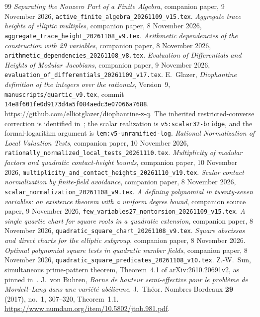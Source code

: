 \documentclass[11pt,a4paper]{article}
\begin{document}
\begin{thebibliography}{99}
\emph{Separating the Nonzero Part of a Finite Algebra},
companion paper, 9 November 2026,
\nolinkurl{active_finite_algebra_20261109_v15.tex}.
\emph{Aggregate trace heights of elliptic multiples},
companion paper, 8 November 2026,
\nolinkurl{aggregate_trace_height_20261108_v9.tex}.
\emph{Arithmetic dependencies of the construction with 29 variables},
companion paper, 8 November 2026,
\nolinkurl{arithmetic_dependencies_20261108_v8.tex}.
\emph{Evaluation of Differentials and Heights of Modular Jacobians},
companion paper, 9 November 2026,
\nolinkurl{evaluation_of_differentials_20261109_v17.tex}.
E.~Glazer, \emph{Diophantine definition of the integers over the
rationals}, Version~9, \nolinkurl{manuscripts/quartic_v9.tex},
commit \nolinkurl{14e8f601fe0d9173d4a5f084aedc3e07066a7688}.
\url{https://github.com/elliotglazer/diophantine-z-q}.
The inherited restricted-converse correction is identified
in~\cite{Dependencies}; the scalar realization is
\nolinkurl{v5:scalar32-bridge}, and the formal-logarithm argument is
\nolinkurl{lem:v5-unramified-log}.
\emph{Rational Normalization of Local Valuation Tests},
companion paper, 10 November 2026,
\nolinkurl{rationally_normalized_local_tests_20261110.tex}.
\emph{Multiplicity of modular factors and quadratic contact-height bounds},
companion paper, 10 November 2026,
\nolinkurl{multiplicity_and_contact_heights_20261110_v19.tex}.
\emph{Scalar contact normalization by finite-field avoidance},
companion paper, 8 November 2026,
\nolinkurl{scalar_normalization_20261108_v9.tex}.
\emph{A defining polynomial in twenty-seven variables:
an existence theorem with a uniform degree bound},
companion source paper, 9 November 2026,
\nolinkurl{few_variables27_nontorsion_20261109_v15.tex}.
\emph{A single quartic chart for square roots in a quadratic extension},
companion paper, 8 November 2026,
\nolinkurl{quadratic_square_chart_20261108_v9.tex}.
\emph{Square abscissas and direct charts for the elliptic subgroup},
companion paper, 8 November 2026.
\emph{Optimal polynomial square tests in quadratic number fields},
companion paper, 8 November 2026,
\nolinkurl{quadratic_square_predicates_20261108_v10.tex}.
Z.-W.~Sun, simultaneous prime-pattern theorem,
Theorem~4.1 of arXiv:2610.20691v2, as pinned in~\cite{Dependencies}.
J.~von Buhren,
\emph{Borne de hauteur semi-effective pour le probl\`eme de
Mordell--Lang dans une vari\'et\'e ab\'elienne},
J.~Th\'eor. Nombres Bordeaux \textbf{29} (2017), no.~1,
307--320, Theorem~1.1.
\url{https://www.numdam.org/item/10.5802/jtnb.981.pdf}.
\end{thebibliography}
\end{document}
